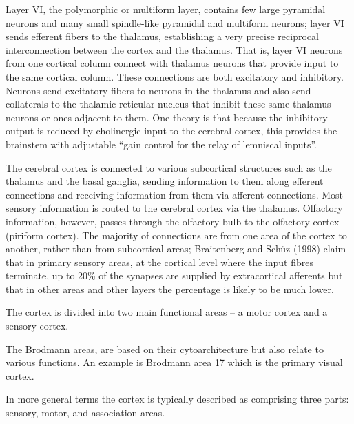 \documentclass[]{book}
\begin{document}
Layer VI, the polymorphic or multiform layer, contains few large pyramidal neurons and many small spindle-like pyramidal and multiform neurons; layer VI sends efferent fibers to the thalamus, establishing a very precise reciprocal interconnection between the cortex and the thalamus. That is, layer VI neurons from one cortical column connect with thalamus neurons that provide input to the same cortical column. These connections are both excitatory and inhibitory. Neurons send excitatory fibers to neurons in the thalamus and also send collaterals to the thalamic reticular nucleus that inhibit these same thalamus neurons or ones adjacent to them. One theory is that because the inhibitory output is reduced by cholinergic input to the cerebral cortex, this provides the brainstem with adjustable ``gain control for the relay of lemniscal inputs''.

The cerebral cortex is connected to various subcortical structures such as the thalamus and the basal ganglia, sending information to them along efferent connections and receiving information from them via afferent connections. Most sensory information is routed to the cerebral cortex via the thalamus. Olfactory information, however, passes through the olfactory bulb to the olfactory cortex (piriform cortex). The majority of connections are from one area of the cortex to another, rather than from subcortical areas; Braitenberg and Schüz (1998) claim that in primary sensory areas, at the cortical level where the input fibres terminate, up to 20\% of the synapses are supplied by extracortical afferents but that in other areas and other layers the percentage is likely to be much lower.

The cortex is divided into two main functional areas -- a motor cortex and a sensory cortex.

The Brodmann areas, are based on their cytoarchitecture but also relate to various functions. An example is Brodmann area 17 which is the primary visual cortex.

In more general terms the cortex is typically described as comprising three parts: sensory, motor, and association areas.
\end{document}
